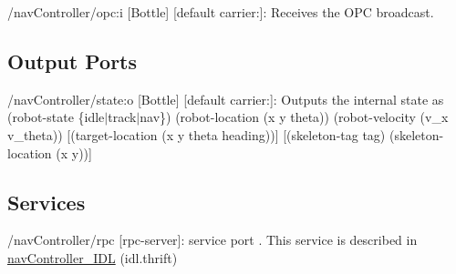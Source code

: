 \begin{DoxyItemize}
\item /nav\+Controller/opc\+:i \mbox{[}Bottle\mbox{]} \mbox{[}default carrier\+:\mbox{]}\+: Receives the O\+PC broadcast.
\end{DoxyItemize}\hypertarget{group__skeletonViewer_outputports_sec}{}\subsection{Output Ports}\label{group__skeletonViewer_outputports_sec}

\begin{DoxyItemize}
\item /nav\+Controller/state\+:o \mbox{[}Bottle\mbox{]} \mbox{[}default carrier\+:\mbox{]}\+: Outputs the internal state as (robot-\/state \{idle$\vert$track$\vert$nav\}) (robot-\/location (x y theta)) (robot-\/velocity (v\+\_\+x v\+\_\+theta)) \mbox{[}(target-\/location (x y theta heading))\mbox{]} \mbox{[}(skeleton-\/tag tag) (skeleton-\/location (x y))\mbox{]}
\end{DoxyItemize}\hypertarget{group__skeletonViewer_services_sec}{}\subsection{Services}\label{group__skeletonViewer_services_sec}

\begin{DoxyItemize}
\item /nav\+Controller/rpc \mbox{[}rpc-\/server\mbox{]}\+: service port . This service is described in \mbox{\hyperlink{classnavController__IDL}{nav\+Controller\+\_\+\+I\+DL}} (idl.\+thrift) 
\end{DoxyItemize}